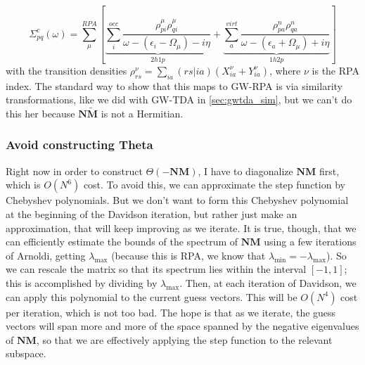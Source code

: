 \begin{equation}
\Sigma_{pq}^{c}(\omega) = \sum_{\mu}^{RPA} \left[\underbrace{\sum_{i}^{occ} \frac{\rho_{pi}^\mu \rho_{qi}^\mu}{\omega - (\epsilon_i - \Omega_\mu) - i\eta}}_{2h1p} + \underbrace{\sum_{a}^{virt} \frac{\rho_{pa}^n \rho_{qa}^n}{\omega - (\epsilon_a + \Omega_\mu) + i\eta}}_{1h2p}\right]
\end{equation}
with the transition densities $\rho_{rs}^\nu = \sum_{ia} (rs|ia) \left(X_{ia}^\nu + Y_{ia}^\nu\right)$, where $\nu$ is the RPA index. 
The standard way to show that this maps to GW-RPA is via similarity transformations, like we did with GW-TDA in \ref{sec:gwtda_sim}, but we can't do this her because $\bm{N}\tilde{\bm{M}}$ is not a Hermitian.
\subsubsection{Avoid constructing Theta}
Right now in order to construct $\Theta(-\bm{N}{\bm{M}})$, I have to diagonalize $\bm{N}{\bm{M}}$ first, which is $O(N^6)$ cost. To avoid this, we can approximate the step function by Chebyshev polynomials. But we don't want to form this Chebyshev polynomial at the beginning of the Davidson iteration, but rather just make an approximation, that will keep improving as we iterate. It is true, though, that we can efficiently estimate the bounds of the spectrum of $\bm{N}{\bm{M}}$ using a few iterations of Arnoldi, getting $\lambda_{\text{max}}$ (because this is RPA, we know that $\lambda_{\text{min}} = -\lambda_{\text{max}} $). So we can rescale the matrix so that its spectrum lies within the interval $[-1,1]$; this is accomplished by dividing by $\lambda_{\text{max}}$. Then, at each iteration of Davidson, we can apply this polynomial to the current guess vectors. This will be $O(N^4)$ cost per iteration, which is not too bad. The hope is that as we iterate, the guess vectors will span more and more of the space spanned by the negative eigenvalues of $\bm{N}{\bm{M}}$, so that we are effectively applying the step function to the relevant subspace.
